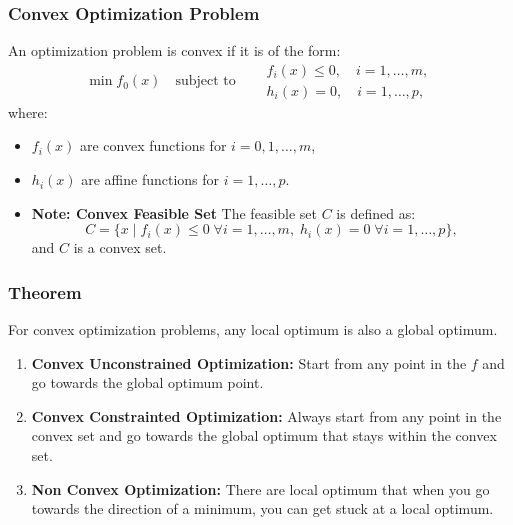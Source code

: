 \subsubsection{Convex Optimization Problem}
\begin{definition}
    An optimization problem is convex if it is of the form:
    \[
    \min f_0(x) \quad \text{subject to} \quad 
    \begin{aligned}
        & f_i(x) \leq 0, \quad i = 1, \dots, m, \\
        & h_i(x) = 0, \quad i = 1, \dots, p,
    \end{aligned}
    \]
    where:
    \begin{itemize}
        \item \( f_i(x) \) are convex functions for \( i = 0, 1, \dots, m \),
        \item \( h_i(x) \) are affine functions for \( i = 1, \dots, p \).
        \item \textbf{Note: Convex Feasible Set}  The feasible set \( C \) is defined as:
        \[
        C = \{ x \mid f_i(x) \leq 0 \; \forall i = 1, \dots, m, \; h_i(x) = 0 \; \forall i = 1, \dots, p \},
        \]
        and \( C \) is a convex set.
    \end{itemize}
\end{definition}

\subsubsection{Theorem}
\begin{theorem}
    For convex optimization problems, any local optimum is also a global optimum.
\end{theorem}

\begin{intuition}
    \begin{enumerate}
        \item \textbf{Convex Unconstrained Optimization:} Start from any point in the $f$ and go towards the global optimum point. 
        \item \textbf{Convex Constrainted Optimization:} Always start from any point in the convex set and go towards the global optimum that stays within the convex set.
        \item \textbf{Non Convex Optimization:} There are local optimum that when you go towards the direction of a minimum, you can get stuck at a local optimum. 
    \end{enumerate}
\end{intuition}

